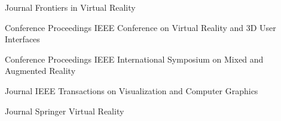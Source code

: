 \begin{cventries}
  \cventry
    {Journal} %
    {Frontiers in Virtual Reality} %
    {} %
    {} %
    {}
    \vspace{-0.15in}
    
  \cventry
    {Conference Proceedings} %
    {IEEE Conference on Virtual Reality and 3D User Interfaces} %
    {} %
    {} %
    {}
    \vspace{-0.15in}
    
  \cventry
    {Conference Proceedings} %
    {IEEE International Symposium on Mixed and Augmented Reality} %
    {} %
    {} %
    {}
    \vspace{-0.15in}
    
  \cventry
    {Journal} %
    {IEEE Transactions on Visualization and Computer Graphics} %
    {} %
    {} %
    {}
    \vspace{-0.15in}

  \cventry
    {Journal} %
    {Springer Virtual Reality} %
    {} %
    {} %
    {}
    \vspace{-0.15in}

  
\end{cventries}